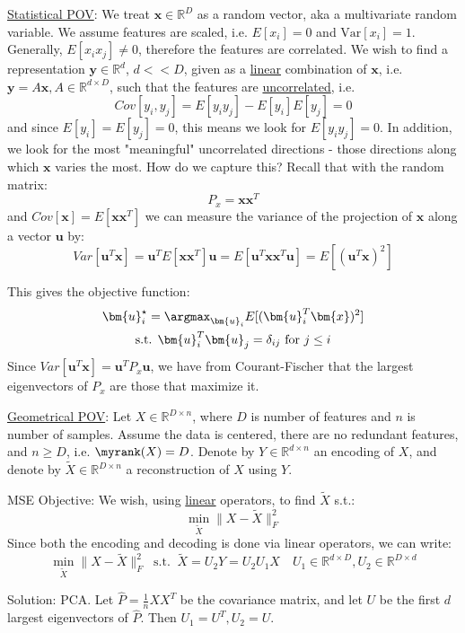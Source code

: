 \documentclass{article}
\begin{document}
\ul{Statistical POV}: We treat $\bm{x} \in \mathbb{R}^{D}$ as a random vector, aka a multivariate random variable. We assume features are scaled, i.e. $E[x_i]=0$ and $\text{Var}[x_i]=1$.  Generally, $E[x_i x_j] \neq 0$, therefore the features are correlated. We wish to find a representation $\bm{y} \in \mathbb{R}^{d}$, $d <<D$, given as a \ul{linear} combination of $\bm{x}$, i.e. $\bm{y}=A \bm{x}, A \in \mathbb{R}^{d \times D}$, such that the features are \ul{uncorrelated}, i.e.
\[
  Cov[y_i,y_j]= E[y_i y_j] - E[y_i] E[y_j] =  0
\]
and since $E[y_i]=E[y_j]=0$, this means we look for $E[y_i y_j]=0$. In addition, we look for the most "meaningful" uncorrelated directions - those directions along which $\bm{x}$ varies the most. How do we capture this? Recall that with the random matrix:
\[
  P_{x} = \bm{x} \bm{x}^{T}
\]
and $Cov[\bm{x}] = E[\bm{x} \bm{x}^{T}]$
we can measure the variance of the projection of $\bm{x}$ along a vector $\bm{u}$ by:
\[
  Var[\bm{u} ^{T} \bm{x}] = \bm{u}^{T} E[\bm{x} \bm{x}^{T}] \bm{u} = E[\bm{u}^{T} \bm{x} \bm{x} ^{T} \bm{u}] = E[(\bm{u}^{T} \bm{x}) ^2]
\]

This gives the objective function:
\begin{gather*}
  \bm{u}_{i} ^{\star} = \argmax_{\bm{u}_i} E[(\bm{u}_i ^{T} \bm{x})^2]   \\
  \text{s.t. } \bm{u}_i ^{T} \bm{u}_{j} = \delta_{ij} \text{ for } j \leq i
\end{gather*}
Since $Var[\bm{u}^{T} \bm{x}] = \bm{u}^{T} P_{x} \bm{u}$, we have from Courant-Fischer that the largest eigenvectors of $P_{x}$ are those that maximize it. 


\ul{Geometrical POV}: Let $X \in \mathbb{R}^{D \times  n}$, where $D$ is number of features and $n$ is number of samples. Assume the data is centered, there are no redundant features, and $n \geq D$, i.e. $\myrank(X) = D$.  Denote by $Y \in \mathbb{R}^{d \times  n}$ an encoding of $X$, and denote by   $\widetilde{X} \in \mathbb{R}^{D \times  n}$ a reconstruction of $X$ using $Y$.


MSE Objective: We wish, using \ul{linear} operators, to find $\widetilde{X}$ s.t.:
  \[
    \min_{\widetilde{X}} \lVert X - \widetilde{X} \rVert_{F}^2
  \]
Since both the encoding and decoding is done via linear operators, we can write:
\[
  \min_{\widetilde{X}} \lVert X - \widetilde{X} \rVert_{F}^2 \ \text{ s.t. } \ \widetilde{X} = U_{2}Y = U_{2} U_{1}X \quad  U_1 \in \mathbb{R}^{d \times  D}, U_2 \in \mathbb{R}^{D \times d}
\]

Solution: PCA. Let $\hat{P} = \frac{1}{n} X X^{T}$ be the covariance matrix, and let $U$ be the first $d$ largest eigenvectors of $\hat{P}$. Then $U_1 = U ^{T}, U_2 = U$.
\end{document}
